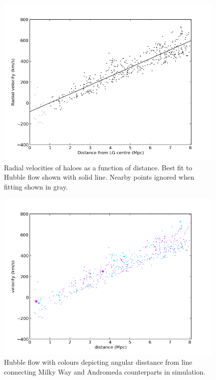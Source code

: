 \documentclass[english, oneside]{HYgradu}
\begin{document}
\begin{figure}
   \centering
   \includegraphics[width=\textwidth]{kuvat/hubbleflow.png}
   \caption{Radial velocities of haloes as a function of distance. Best fit to Hubble flow shown with solid line. Nearby points ignored when fitting shown in gray.}\label{fig:hubbleflow}
\end{figure}

\begin{figure}
   \centering
   \includegraphics[width=\textwidth]{kuvat/hubbleflow-colour.png}
   \caption{Hubble flow with colours depicting angular disstance from line connecting Milky Way and Andromeda counterparts in simulation.}\label{fig:hubbleflow-colour}
\end{figure}
\end{document}
